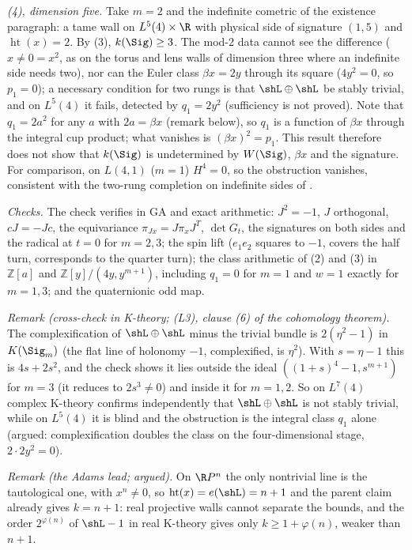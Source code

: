 \emph{(4), dimension five.} Take $m = 2$ and the indefinite cometric of the existence paragraph: a tame wall on $L^{5}(4) \times \R$ with physical side of signature $(1,5)$ and $\operatorname{ht}(x) = 2$. By (3), $k(\Sig) \geq 3$. The mod-2 data cannot see the difference ($x \neq 0 = x^{2}$, as on the torus and lens walls of dimension three where an indefinite side needs two), nor can the Euler class $\beta x = 2y$ through its square ($4y^{2} = 0$, so $p_{1} = 0$); a necessary condition for two rungs is that $\shL \oplus \shL$ be stably trivial, and on $L^{5}(4)$ it fails, detected by $q_{1} = 2y^{2}$ (sufficiency is not proved). Note that $q_{1} = 2a^{2}$ for any $a$ with $2a = \beta x$ (remark below), so $q_{1}$ is a function of $\beta x$ through the integral cup product; what vanishes is $(\beta x)^{2} = p_{1}$. This result therefore does not show that $k(\Sig)$ is undetermined by $W(\Sig)$, $\beta x$ and the signature. For comparison, on $L(4,1)$ ($m = 1$) $H^{4} = 0$, so the obstruction vanishes, consistent with the two-rung completion on indefinite sides of .

\emph{Checks.} The check verifies in GA and exact arithmetic: $J^{2} = -1$, $J$ orthogonal, $cJ = -Jc$, the equivariance $\pi_{Jx} = J\pi_{x}J^{T}$, $\det G_{t}$, the signatures on both sides and the radical at $t = 0$ for $m = 2, 3$; the spin lift ($e_{1}e_{2}$ squares to $-1$, covers the half turn, corresponds to the quarter turn); the class arithmetic of (2) and (3) in $\mathbb{Z}[a]$ and $\mathbb{Z}[y]/(4y, y^{m+1})$, including $q_{1} = 0$ for $m = 1$ and $w = 1$ exactly for $m = 1, 3$; and the quaternionic odd map.

\emph{Remark (cross-check in K-theory; (L3), clause (6) of the cohomology theorem).} The complexification of $\shL \oplus \shL$ minus the trivial bundle is $2(\eta^{2} - 1)$ in $K(\Sig_{m})$ (the flat line of holonomy $-1$, complexified, is $\eta^{2}$). With $s = \eta - 1$ this is $4s + 2s^{2}$, and the check shows it lies outside the ideal $((1+s)^{4} - 1, s^{m+1})$ for $m = 3$ (it reduces to $2s^{3} \neq 0$) and inside it for $m = 1, 2$. So on $L^{7}(4)$ complex K-theory confirms independently that $\shL \oplus \shL$ is not stably trivial, while on $L^{5}(4)$ it is blind and the obstruction is the integral class $q_{1}$ alone (argued: complexification doubles the class on the four-dimensional stage, $2 \cdot 2y^{2} = 0$).

\emph{Remark (the Adams lead; argued).} On $\R P^{n}$ the only nontrivial line is the tautological one, with $x^{n} \neq 0$, so $\operatorname{ht}(x) = e(\shL) = n+1$ and the parent claim already gives $k = n + 1$: real projective walls cannot separate the bounds, and the order $2^{\varphi(n)}$ of $\shL - 1$ in real K-theory gives only $k \geq 1 + \varphi(n)$, weaker than $n + 1$.

